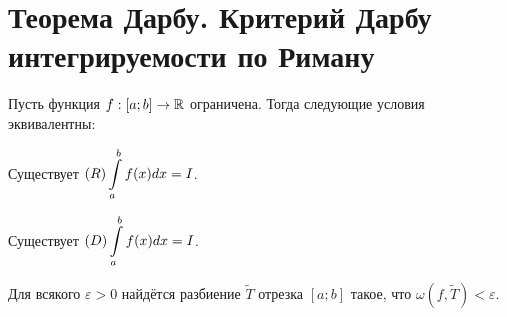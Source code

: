 \section{Теорема Дарбу. Критерий Дарбу интегрируемости по Риману}

\begin{theorem}[Дарбу]
    Пусть функция $f: [a; b] \to \mathbb{R}$ ограничена. Тогда следующие условия эквивалентны:
    \begin{enumerate}[nolistsep]
        \begin{minipage}{.5\textwidth}
            \item Существует $\displaystyle(R)\int\limits_a^bf(x)dx = I$.
        \end{minipage}
        \begin{minipage}{.5\textwidth}
            \item Существует $\displaystyle(D)\int\limits_a^bf(x)dx = I$.
        \end{minipage}
        \item Для всякого $\varepsilon > 0$ найдётся разбиение $\widetilde{T}$ отрезка $[a; b]$ такое, что $\omega(f, \widetilde{T}) < \varepsilon$.
    \end{enumerate}
\end{theorem}

